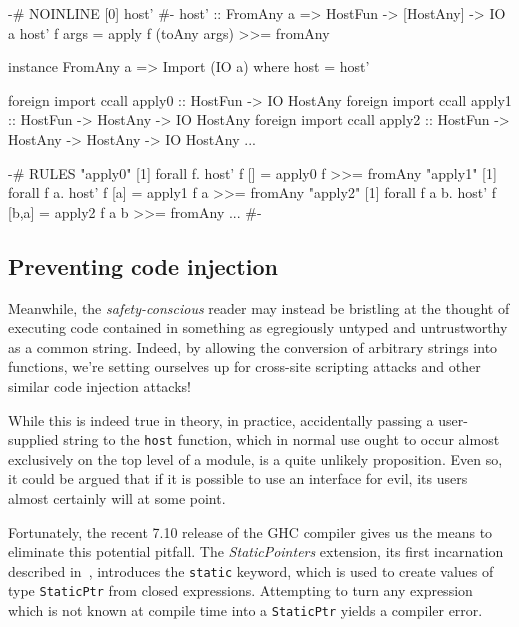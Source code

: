 \documentclass{sigplanconf}
\begin{document}
\begin{listingfloat}
\begin{code}
  {-# NOINLINE [0] host' #-}
  host' :: FromAny a => HostFun -> [HostAny] -> IO a
  host' f args = apply f (toAny args) >>= fromAny

  instance FromAny a => Import (IO a) where
    host = host'
  
  foreign import ccall
    apply0 :: HostFun -> IO HostAny
  foreign import ccall
    apply1 :: HostFun -> HostAny -> IO HostAny
  foreign import ccall
    apply2 :: HostFun -> HostAny -> HostAny -> IO HostAny
  ...
  
  {-# RULES
    "apply0" [1] forall f. host' f [] =
                 apply0 f >>= fromAny
    "apply1" [1] forall f a. host' f [a] =
                 apply1 f a >>= fromAny
    "apply2" [1] forall f a b. host' f [b,a] =
                 apply2 f a b >>= fromAny
    ...
   #- }
\end{code}
\caption{Specializing the \lstinline!host! base case}
\label{lst:specialization}
\end{listingfloat}

\subsection{Preventing code injection}
\label{sec:safe_host}
Meanwhile, the \emph{safety-conscious} reader may instead be bristling at the
thought of executing code contained in something as egregiously untyped and
untrustworthy as a common string.
Indeed, by allowing the conversion of arbitrary strings
into functions, we're setting ourselves up for cross-site scripting attacks
and other similar code injection attacks!

While this is indeed true in theory, in practice, accidentally passing a
user-supplied string to the \lstinline!host! function, which in normal use
ought to occur almost exclusively on the top level of a module, is a quite
unlikely proposition. Even so, it could be argued that if it is possible to use
an interface for evil, its users almost certainly will at some point.

Fortunately, the recent 7.10 release of the GHC compiler gives us the means to
eliminate this potential pitfall. The \emph{StaticPointers} extension, its
first incarnation described in\ \cite{cloudhaskell}, introduces the
\lstinline!static! keyword, which is used to create values of type
\lstinline!StaticPtr! from closed expressions. Attempting to turn any
expression which is not known at compile time into a \lstinline!StaticPtr!
yields a compiler error.
\end{document}
